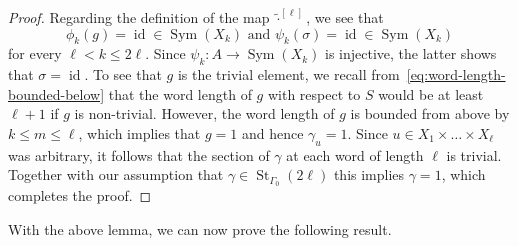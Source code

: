 \documentclass[a4paper]{amsart}
\renewcommand\leq\leqslant
\numberwithin{equation}{section}
\theoremstyle{definition}
\theoremstyle{remark}
\DeclareMathOperator{\id}{id}
\DeclareMathOperator{\St}{St}
\DeclareMathOperator{\Sym}{Sym}
\begin{document}
\begin{proof}
Regarding the definition of the map $\widetilde{\cdot}^{[\ell]}$, we see that
\[
\phi_{k}(g) = \id \in \Sym(X_{k}) \text{ and } \psi_{k}(\sigma) = \id \in \Sym(X_{k})
\]
for every $\ell < k \leq 2\ell$.
Since $\psi_k \colon A \rightarrow \Sym(X_{k})$ is injective, the latter shows that $\sigma = \id$.
To see that $g$ is the trivial element, we recall from~\eqref{eq:word-length-bounded-below} that the word length of $g$ with respect to $S$ would be at least $\ell+1$ if $g$ is non-trivial.
However, the word length of $g$ is bounded from above by $k \leq m \leq \ell$, which implies that $g = 1$ and hence $\gamma_u = 1$.
Since $u \in X_1 \times \ldots \times X_{\ell}$ was arbitrary, it follows that the section of $\gamma$ at each word of length $\ell$ is trivial.
Together with our assumption that $\gamma \in \St_{\Gamma_{0}}(2\ell)$ this implies $\gamma = 1$, which completes the proof.
\end{proof}

With the above lemma, we can now prove the following result.
\end{document}
